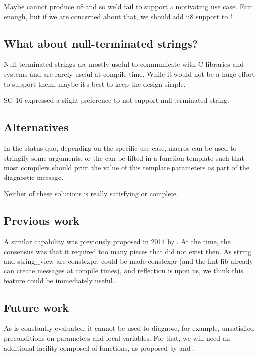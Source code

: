 \documentclass{wg21}
\begin{document}
Maybe  cannot produce u8 and so we'd fail to support a motivating use case.
Fair enough, but if we are concerned about that, we should add u8 support to  !


\subsection{What about null-terminated strings?}

Null-terminated strings are mostly useful to communicate with C libraries and systems and are rarely useful at compile time.
While it would not be a huge effort to support them, maybe it's best to keep the design simple.

SG-16 expressed a slight preference to not support null-terminated string.

\subsection{Alternatives}

In the status quo, depending on the specific use case, macros can be used to stringify some arguments, or
the  can be lifted in a function template such that most compilers should print the value
of this template parameters as part of the diagnostic message.

Neither of these solutions is really satisfying or complete.

\subsection{Previous work}

A similar capability was previously proposed in 2014 by .
At the time, the consensus was that it required too many pieces that did not exist then.
As string and string_view are constexpr,  could be made constexpr (and the fmt lib already can create messages at compile times), and reflection is upon us,
we think this feature could be immediately useful.

\subsection{Future work}

As  is constantly evaluated, it cannot be used to diagnose, for example, unsatisfied preconditions on parameters and local variables.
For that, we will need an additional facility composed of  functions, as proposed by  and .
\end{document}
